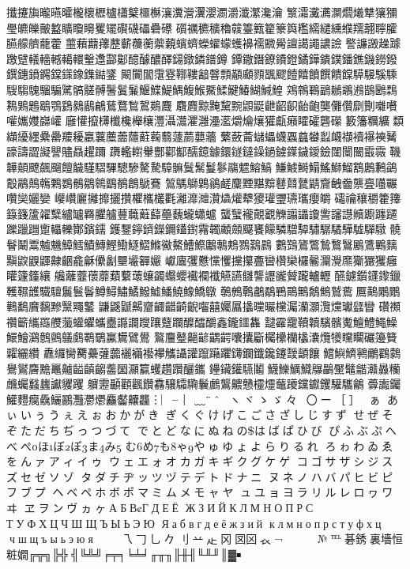 攕攓旟曨曣曤櫳櫰櫪櫨櫹櫱櫮櫯瀼瀵瀯瀷瀴瀱灂瀸瀿瀺瀹
瀪灀瀻瀳灁爓爔犨獽獼璺皫皪皾盭矌矎矏矍矲礥礣礧礨礤
礩禲穮穬穭竷籉籈籊籇籅糮繻繾纁纀羺翿聹臛臙艨艩蘢藿
蘁藾蘛蘀藶蘄蘉蘅蘌藽蠙蠐蠑蠗蠓蠖襣襦覹觷譠譪譝譨譣
譥譧譭趮躆躈躄轙轖轗轕轘轚邍酃酁醷醵醲醳鐋鐓鏻鐠鐏
鐔鏾鐕鐐鐨鐙鐍鏵鐀鏷鐇鐎鐖鐒鏺鐉鏸鐼鐊鏿鏼鐌鏶鐑鐆
闞闠闟霮霯鞹鞻韽韾顠顢顣顟飁飂饐饎饙饌饋饓騲騴騱騬
騪騶騩騮騸騭髇髊髆鬐鬒鬑鰋鰈鯷鰅鰒鯸鱀鰇鰎鰆鰗鰔鰉
鶟鶙鶤鶝鶒鶘鶐鶛鶠鶔鶜鶪鶗鶡鶚鶢鶨鶞鶣鶿鶩鶖鶦鶧麙
麛麚黥黤黧黦鼰鼮齛齠齞齝齙龑儺儹劘劗囃嚽嚾孈孇巋巏
廱懽攛欂櫼欃櫸欀灃灄灊灈灉灅灆爝爚爙獾甗癪矐礭礱礯
籔籓糲纊纇纈纋纆纍罍羻耰臝蘘蘪蘦蘟蘣蘜蘙蘧蘮蘡蘠
蘩蘞蘥蠩蠝蠛蠠蠤蠜蠫衊襭襩襮襫觺譹譸譅譺譻贐贔趯躎
躌轞轛轝酆酄酅醹鐿鐻鐶鐩鐽鐰鐹鐪鐷鐬鑀鐱闥闤闣霵霺
鞿韡顤飉飆飀饘饖騹騽驆驄驂驁騺騿髍鬕鬗鬘鬖鬺魒鰫鰝
鰜鰬鰣鰨鰩鰤鰡鶷鶶鶼鷁鷇鷊鷏鶾鷅鷃鶻鶵鷎鶹鶺鶬鷈鶱
鶭鷌鶳鷍鶲鹺麜黫黮黭鼛鼘鼚鼱齎齥齤龒亹囆囅囋奱孋孌
巕巑廲攡攠攦攢欋欈欉氍灕灖灗灒爞爟犩獿瓘瓕瓙瓗癭皭
礵禴穰穱籗籜籙籛籚糴糱纑罏羇臞艫蘴蘵蘳蘬蘲蘶蠬蠨蠦
蠪蠥襱覿覾觻譾讄讂讆讅譿贕躕躔躚躒躐躖躗轠轢酇鑌鑐
鑊鑋鑏鑇鑅鑈鑉鑆霿韣顪顩飋饔饛驎驓驔驌驏驈驊驉驒驐
髐鬙鬫鬻魖魕鱆鱈鰿鱄鰹鰳鱁鰼鰷鰴鰲鰽鰶鷛鷒鷞鷚鷋鷐
鷜鷑鷟鷩鷙鷘鷖鷵鷕鷝麶黰鼵鼳鼲齂齫龕龢儽劙壨壧奲孍
巘蠯彏戁戃戄攩攥斖曫欑欒欏毊灛灚爢玂玁玃癰矔籧籦纕
艬蘺虀蘹蘼蘱蘻蘾蠰蠲蠮蠳襶襴襳觾讌讎讋讈豅贙躘轤轣
醼鑢鑕鑝鑗鑞韄韅頀驖驙鬞鬟鬠鱒鱘鱐鱊鱍鱋鱕鱙鱌鱎鷻
鷷鷯鷣鷫鷸鷤鷶鷡鷮鷦鷲鷰鷢鷬鷴鷳鷨鷭黂黐黲黳鼆鼜
鼸鼷鼶齃齏齱齰齮齯囓囍孎屭攭曭曮欓灟灡灝灠爣瓛瓥矕
礸禷禶籪纗羉艭虃蠸蠷蠵衋讔讕躞躟躠躝醾醽釂鑫鑨鑩雥
靆靃靇韇韥驞髕魙鱣鱧鱦鱢鱞鱠鸂鷾鸇鸃鸆鸅鸀鸁鸉鷿鷽
鸄麠鼞齆齴齵齶囔攮斸欘欙欗欚灢爦犪矘矙礹籩籫糶纚纘
纛纙臠臡虆虇虈襹襺襼襻觿讘讙躥躤躣鑮鑭鑯鑱鑳靉顲饟
鱨鱮鱭鸋鸍鸐鸏鸒鸑麡黵鼉齇齸齻齺齹圞灦籯蠼趲躦釃鑴
鑸鑶鑵驠鬮鱴鱳鱱鱵鸔鸓黶鼊龤灨灥糷虪蠾蠽蠿讞貜躩
軉靋顳顴飌饡馫驤驦驧鬤鸕鸗齈戇欞爧虌躨钂钀钁驩驨鸙
虋讟钃鱹麷癵驫鱺鸝灩灪爩麤齾齉龘︙︳╴︴﹏¨̈ˆ
＾ヽヾゝゞ々〆〇ー［］✽ぁ
あぃいぅうぇえぉおかがき
ぎくぐけげこごさざしじすず
せぜそぞただちぢっつづて
でとどなにぬねのはばぱひび
ぴふぶぷへべぺほぼぽまみ
むめもゃやゅゆょよらりるれ
ろゎわゐゑをんァアィイゥ
ウェエォオカガキギクグケゲ
コゴサザシジスズセゼソゾ
タダチヂッツヅテデトドナニ
ヌネノハバパヒビピフブプ
ヘベペホボポマミムメモャヤ
ュユョヨラリルレロヮワヰ
ヱヲンヴヵヶАБВГДЕЁ
ЖЗИЙКЛМНОПРС
ТУФХЦЧШЩЪЫЬЭЮ
Яабвгдеёжзий
клмнопрстуфхц
чшщъыьэюя⇧↸↹
㇏乁𠃌乚𠂊刂䒑龰冈㘝龱𧘇¬￢
￤＇＂㈱№℡碁銹裏墻恒粧嫺╔╦╗╠╬
╣╚╩╝╒╤╕╘╧╛╓╥╖╟╫╢╙╨╜║▓￭


